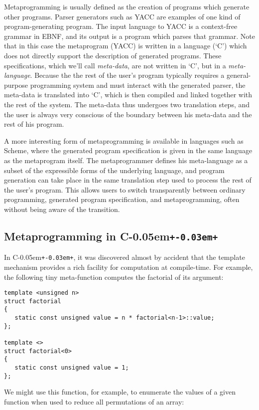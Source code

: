 \documentclass{netobjectdays}
\newcommand{\Cpp}{C\kern-0.05em\texttt{+\kern-0.03em+}}
\begin{document}
Metaprogramming is usually defined as the creation of programs which
generate other programs. Parser generators such as YACC are examples
of one kind of program-generating program. The input language to YACC
is a context-free grammar in EBNF, and its output is a program which
parses that grammar. Note that in this case the metaprogram (YACC) is
written in a language (`C') which does not directly support the
description of generated programs. These specifications, which we'll
call \emph{meta-data}, are not written in `C', but in a
\emph{meta-language}. Because the the rest of the user's program
typically requires a general-purpose programming system and must
interact with the generated parser, the meta-data is translated into
`C', which is then compiled and linked together with the rest of the
system. The meta-data thus undergoes two translation steps, and the
user is always very conscious of the boundary between his meta-data
and the rest of his program.

A more interesting form of metaprogramming is available in languages
such as Scheme, where the generated program specification is given in
the same language as the metaprogram itself. The metaprogrammer
defines his meta-language as a subset of the expressible forms of the
underlying language, and program generation can take place in the same
translation step used to process the rest of the user's program. This
allows users to switch transparently between ordinary programming,
generated program specification, and metaprogramming, often without
being aware of the transition.

\subsection{Metaprogramming in \Cpp }

In \Cpp, it was discovered almost by accident that the template
mechanism provides a rich facility for computation at
compile-time. For example, the following tiny meta-function computes the
factorial of its argument:

{\footnotesize
\begin{verbatim}
template <unsigned n>
struct factorial
{
   static const unsigned value = n * factorial<n-1>::value;
};

template <>
struct factorial<0>
{
   static const unsigned value = 1;
};
\end{verbatim}
}

We might use this function, for example, to enumerate the values of a
given function when used to reduce all permutations of an array:
\end{document}

